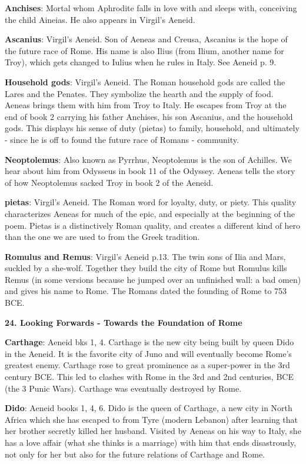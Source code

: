 \documentclass{scrartcl}
\begin{document}
\begin{multicols*}{3}
{\bf Anchises}: Mortal whom Aphrodite falls in love with and sleeps with, conceiving the child Aineias. He also appears in Virgil's Aeneid.

{\bf Ascanius}: Virgil's Aeneid. Son of Aeneas and Creusa, Ascanius is the hope of the future race of Rome. His name is also Ilius (from Ilium, another name for Troy), which gets changed to Iulius when he rules in Italy. See Aeneid p. 9.

{\bf Household gods}: Virgil's Aeneid. The Roman household gods are called the Lares and the Penates. They symbolize the hearth and the supply of food. Aeneas brings them with him from Troy to Italy. He escapes from Troy at the end of book 2 carrying his father Anchises, his son Ascanius, and the household gods.
This displays his sense of duty (pietas) to family, household, and ultimately - since he is off to found the future race of Romans - community.

{\bf Neoptolemus}: Also known as Pyrrhus, Neoptolemus is the son of Achilles. We hear about him from Odysseus in book 11 of the Odyssey. Aeneas tells the story of how Neoptolemus sacked Troy in book 2 of the Aeneid.

{\bf pietas}: Virgil's Aeneid. The Roman word for loyalty, duty, or piety. This quality characterizes Aeneas for much of the epic, and especially at the beginning of the poem. Pietas is a distinctively Roman quality, and creates a different kind of hero than the one we are used to from the Greek tradition.

{\bf Romulus and Remus}: Virgil's Aeneid p.13. The twin sons of Ilia and Mars, suckled by a she-wolf. Together they build the city of Rome but Romulus kills Remus (in some versions because he jumped over an unfinished wall: a bad omen) and gives his name to Rome. The Romans dated the founding of Rome to 753 BCE.


{\bf 24. Looking Forwards - Towards the Foundation of Rome}

{\bf Carthage}: Aeneid bks 1, 4. Carthage is the new city being built by queen Dido in the Aeneid. It is the favorite city of Juno and will eventually become Rome's greatest enemy. Carthage rose to great prominence as a super-power in the 3rd century BCE. This led to clashes with Rome in the 3rd and 2nd centuries, BCE (the 3 Punic Wars). Carthage was eventually destroyed by Rome.

{\bf Dido}: Aeneid books 1, 4, 6. Dido is the queen of Carthage, a new city in North Africa which she has escaped to from Tyre (modern Lebanon) after learning that her brother secretly killed her husband. Visited by Aeneas on his way to Italy, she has a love affair (what she thinks is a marriage) with him that ends disastrously, not only for her but also for the future relations of Carthage and Rome.


\end{multicols*}
\end{document}
